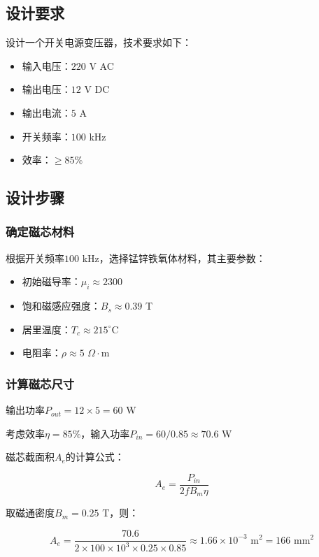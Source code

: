 \documentclass[12pt,UTF8]{ctexbook}
\begin{document}
\subsection{设计要求}

设计一个开关电源变压器，技术要求如下：

\begin{itemize}[leftmargin=2cm]
    \item 输入电压：$220$ V AC
    \item 输出电压：$12$ V DC
    \item 输出电流：$5$ A
    \item 开关频率：$100$ kHz
    \item 效率：$\ge 85\%$
\end{itemize}

\subsection{设计步骤}

\subsubsection{确定磁芯材料}

根据开关频率$100$ kHz，选择锰锌铁氧体材料，其主要参数：

\begin{itemize}[leftmargin=2cm]
    \item 初始磁导率：$\mu_i \approx 2300$
    \item 饱和磁感应强度：$B_s \approx 0.39$ T
    \item 居里温度：$T_c \approx 215^\circ$C
    \item 电阻率：$\rho \approx 5$ $\Omega\cdot$m
\end{itemize}

\subsubsection{计算磁芯尺寸}

输出功率$P_{out} = 12 \times 5 = 60$ W

考虑效率$\eta = 85\%$，输入功率$P_{in} = 60 / 0.85 \approx 70.6$ W

磁芯截面积$A_e$的计算公式：

$$ A_e = \frac{P_{in}}{2 f B_m \eta} $$

取磁通密度$B_m = 0.25$ T，则：

$$ A_e = \frac{70.6}{2 \times 100 \times 10^3 \times 0.25 \times 0.85} \approx 1.66 \times 10^{-3} \text{ m}^2 = 166 \text{ mm}^2 $$
\end{document}

